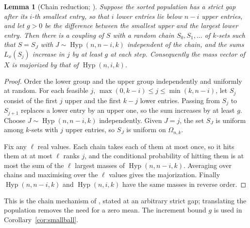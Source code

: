 \documentclass[11pt]{article}
\newtheorem{lemma}[theorem]{Lemma}
\theoremstyle{remark}
\newcommand{\Hyp}{\operatorname{Hyp}}
\begin{document}
\begin{lemma}[Chain reduction; \cite{AKP}]\label{lem:chain}
Suppose the sorted population has a strict gap after its \(i\)-th smallest
entry, so that \(i\) lower entries lie below \(n-i\) upper entries, and let
\(g>0\) be the difference between the smallest upper and the largest lower
entry. Then there is a coupling of \(S\) with a random chain
\(S_0,S_1,\ldots\) of \(k\)-sets such that \(S=S_J\) with
\(J\sim\Hyp(n,n-i,k)\) independent of the chain, and the sums
\(L_x(S_j)\) increase in \(j\) by at least \(g\) at each step. Consequently
the mass vector of \(X\) is majorized by that of \(\Hyp(n,i,k)\).
\end{lemma}
\begin{proof}
Order the lower group and the upper group independently and uniformly at
random. For each feasible \(j\), \(\max(0,k-i)\le j\le\min(k,n-i)\), let
\(S_j\) consist of the first \(j\) upper and the first \(k-j\) lower entries.
Passing from \(S_j\) to \(S_{j+1}\) replaces a lower entry by an upper one, so
the sum increases by at least \(g\). Choose \(J\sim\Hyp(n,n-i,k)\)
independently. Given \(J=j\), the set \(S_J\) is uniform among \(k\)-sets with
\(j\) upper entries, so \(S_J\) is uniform on \(\Omega_{n,k}\).

Fix any \(\ell\) real values. Each chain takes each of them at most once, so it
hits them at at most \(\ell\) ranks \(j\), and the conditional probability of
hitting them is at most the sum of the \(\ell\) largest masses of
\(\Hyp(n,n-i,k)\). Averaging over chains and maximising over the \(\ell\)
values gives the majorization. Finally \(\Hyp(n,n-i,k)\) and \(\Hyp(n,i,k)\)
have the same masses in reverse order.
\end{proof}
This is the chain mechanism of \cite[Lemma~3 and Section~4]{AKP}, stated at an
arbitrary strict gap; translating the population removes the need for a zero
mean. The increment bound \(g\) is used in Corollary~\ref{cor:smallball}.
\end{document}
